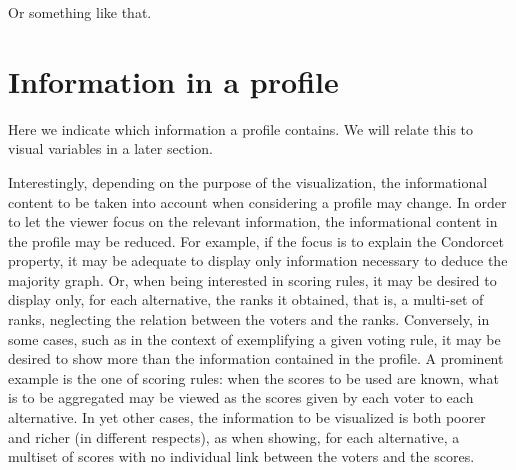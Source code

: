 \documentclass[version=last, pagesize, twoside=off, bibliography=totoc, DIV=calc, fontsize=12pt, a4paper, french, english]{scrartcl}
\begin{document}
Or something like that.

\section{Information in a profile}
Here we indicate which information a profile contains.
We will relate this to visual variables in a later section.

Interestingly, depending on the purpose of the visualization, the informational content to be taken into account when considering a profile may change. In order to let the viewer focus on the relevant information, the informational content in the profile may be reduced. For example, if the focus is to explain the Condorcet property, it may be adequate to display only information necessary to deduce the majority graph. Or, when being interested in scoring rules, it may be desired to display only, for each alternative, the ranks it obtained, that is, a multi-set of ranks, neglecting the relation between the voters and the ranks. Conversely, in some cases, such as in the context of exemplifying a given voting rule, it may be desired to show more than the information contained in the profile. A prominent example is the one of scoring rules: when the scores to be used are known, what is to be aggregated may be viewed as the scores given by each voter to each alternative. In yet other cases, the information to be visualized is both poorer and richer (in different respects), as when showing, for each alternative, a multiset of scores with no individual link between the voters and the scores.
\end{document}
